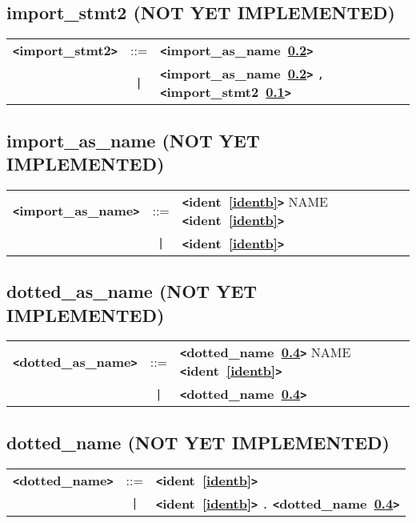 \documentclass[12pt]{article}
\begin{document}
\subsection{import\_stmt2 (NOT YET IMPLEMENTED)}
\label{importzzzstmt2b}
\begin{tabular}{lcl}
{\bf \verb+<+import\_stmt2\verb+>+} & ::=  & {\bf \verb+<+import\_as\_name~\ref{importzzzaszzznameb}\verb+>+}  \\
 & \verb+|+  & {\bf \verb+<+import\_as\_name~\ref{importzzzaszzznameb}\verb+>+}  \verb|,| {\bf \verb+<+import\_stmt2~\ref{importzzzstmt2b}\verb+>+}  \\
\end{tabular}

\subsection{import\_as\_name (NOT YET IMPLEMENTED)}
\label{importzzzaszzznameb}
\begin{tabular}{lcl}
{\bf \verb+<+import\_as\_name\verb+>+} & ::=  & {\bf \verb+<+ident~\ref{identb}\verb+>+}  NAME {\bf \verb+<+ident~\ref{identb}\verb+>+}  \\
 & \verb+|+  & {\bf \verb+<+ident~\ref{identb}\verb+>+}  \\
\end{tabular}

\subsection{dotted\_as\_name (NOT YET IMPLEMENTED)}
\label{dottedzzzaszzznameb}
\begin{tabular}{lcl}
{\bf \verb+<+dotted\_as\_name\verb+>+} & ::=  & {\bf \verb+<+dotted\_name~\ref{dottedzzznameb}\verb+>+}  NAME {\bf \verb+<+ident~\ref{identb}\verb+>+}  \\
 & \verb+|+  & {\bf \verb+<+dotted\_name~\ref{dottedzzznameb}\verb+>+}  \\
\end{tabular}

\subsection{dotted\_name (NOT YET IMPLEMENTED)}
\label{dottedzzznameb}
\begin{tabular}{lcl}
{\bf \verb+<+dotted\_name\verb+>+} & ::=  & {\bf \verb+<+ident~\ref{identb}\verb+>+}  \\
 & \verb+|+  & {\bf \verb+<+ident~\ref{identb}\verb+>+}  \verb|.| {\bf \verb+<+dotted\_name~\ref{dottedzzznameb}\verb+>+}  \\
\end{tabular}
\end{document}
